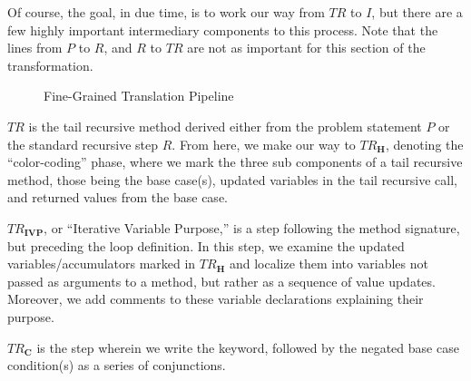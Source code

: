 Of course, the goal, in due time, is to work our way from \emph{$TR$} to $I$, but there are a few highly important intermediary components to this process. Note that the lines from $P$ to $R$, and $R$ to $TR$ are not as important for this section of the transformation.

\begin{figure}[h!]
\centering
{}
\caption{Fine-Grained Translation Pipeline}
\end{figure}

$TR$ is the tail recursive method derived either from the problem statement $P$ or the standard recursive step $R$. From here, we make our way to \emph{$TR_\mathbf{H}$}, denoting the ``color-coding'' phase, where we mark the three sub components of a tail recursive method, those being the base case(s), updated variables in the tail recursive call, and returned values from the base case. 

\emph{$TR_\mathbf{IVP}$}, or ``Iterative Variable Purpose,'' is a step following the method signature, but preceding the loop definition. In this step, we examine the updated variables/accumulators marked in \emph{$TR_\mathbf{H}$} and localize them into variables not passed as arguments to a method, but rather as a sequence of value updates. Moreover, we add comments to these variable declarations explaining their purpose.

\emph{$TR_\mathbf{C}$} is the step wherein we write the  keyword, followed by the negated base case condition(s) as a series of conjunctions.


